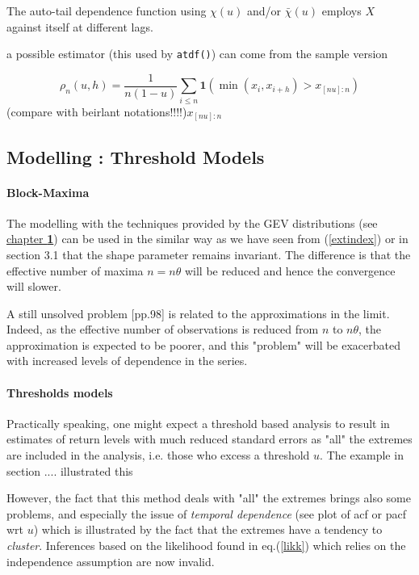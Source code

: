 The auto-tail dependence function using $\chi(u)$ and/or $\bar{\chi}(u)$ employs $X$ against itself at different lags.


a possible estimator (this used by \texttt{atdf()}) can come from the sample version 

\begin{equation}\label{autotailsample}
\rho_n(u,h)=\frac{1}{n(1-u)}\sum_{i\leq n}\mathbf{ 1}(\min (x_i,x_{i+h})>x_{[nu]:n})
\end{equation}
(compare with beirlant notations!!!!)$x_{[nu]:n}$


\subsection{Modelling : Threshold Models}

\paragraph*{Block-Maxima}
The modelling with the techniques provided by the GEV distributions (see 
\hyperref[sec::1]{chapter \textbf{1}}) can be used in 
the similar way as we have seen from (\ref{extindex}) or in section 3.1 that the shape 
parameter remains invariant. The difference is that the effective number of maxima 
$n=n\theta$ 
will be reduced and hence the convergence will slower. 

A still unsolved problem \cite{coles_introduction_2001}[pp.98] is related to the 
approximations in the limit.
Indeed, as the effective number of observations is reduced from $n$ to $n\theta$, the approximation is expected to be poorer, and this "problem" will be exacerbated
with increased levels of dependence in the series.

\paragraph*{Thresholds models}
Practically speaking, one might expect a threshold based analysis to result in estimates of return levels with much reduced standard errors as "all" the extremes are included in the analysis, i.e. those who excess a threshold $u$. The example in section .... illustrated this

However, the fact that this method deals with "all" the extremes brings also some problems, 
and especially the issue of \textit{temporal dependence} (see plot of acf or pacf wrt $u$) 
which is illustrated by the fact that the extremes have a tendency to \emph{cluster}. 
Inferences based on the likelihood found in eq.(\ref{likk}) which relies on the 
independence assumption are now invalid.

